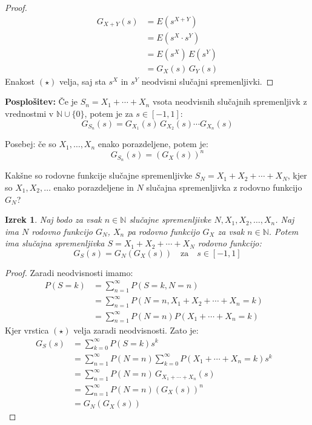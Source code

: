 \documentclass[12pt]{book}
\def\n{\noindent}
\def\s{\vspace{10pt}}
\theoremstyle{definition}
\theoremstyle{plain}
\newtheorem{izrek}{Izrek}
\theoremstyle{plain}
\theoremstyle{plain}
\theoremstyle{remark}
\begin{document}
\begin{proof}
    \begin{align*}
        G_{X+Y}(s)&=E\left(s^{X+Y}\right) \\
        &=E(s^X \cdot s^Y) \\
        &=E(s^X) \, E(s^Y) \tag{$\star$} \\
        &=G_X(s) \, G_Y(s)
    \end{align*}
    Enakost $(\star)$ velja, saj sta $s^X$ in $s^Y$ neodvisni slučajni spremenljivki.
\end{proof}

\n \textbf{Posplošitev:} Če je $S_n=X_1 + \cdots + X_n$ vsota neodvisnih slučajnih spremenljivk z vrednostmi v $\mathbb{N} \cup \{0\}$, potem je za $s \in [-1, 1]$: 
$$
G_{S_n}(s)=G_{X_1}(s)\, G_{X_2}(s) \cdots G_{X_n}(s)
$$

\n Posebej: če so $X_1, \ldots, X_n$ enako porazdeljene, potem je: 
$$
G_{S_n}(s)=\left(G_X(s)\right)^n
$$

\s

\n Kakšne so rodovne funkcije slučajne spremenljivke $S_N=X_1 + X_2 + \cdots + X_N$, kjer so $X_1, X_2, \ldots$ enako porazdeljene in $N$ slučajna spremenljivka z rodovno funkcijo $G_N$?

\begin{izrek}
    Naj bodo za vsak $n \in \mathbb{N}$ slučajne spremenljivke $N, X_1, X_2, \ldots, X_n$. Naj ima $N$ rodovno funkcijo $G_N$, $X_n$ pa rodovno funkcijo $G_X$ za vsak $n \in \mathbb{N}$. Potem ima slučajna spremenljivka $S=X_1+X_2+\cdots+X_N$ rodovno funkcijo: 
    $$
    G_S(s)=G_N\left(G_X(s)\right) \quad \text{za} \quad s \in [-1,1]
    $$
\end{izrek}

\begin{proof}
    Zaradi neodvisnosti imamo: 
    \begin{align*}
        P(S=k)&=\sum_{n=1}^{\infty} P(S=k, N=n) & \\
        &=\sum_{n=1}^{\infty} P\left(N=n, X_1+X_2+ \cdots +X_n=k\right) & \\
        &=\sum_{n=1}^{\infty} P(N=n) P\left(X_1+\cdots+X_n=k\right) & \tag{$\star$}
    \end{align*}
    Kjer vrstica $(\star)$ velja zaradi neodvisnosti. Zato je: 
    \begin{align*}
        G_S(s)&=\sum_{k=0}^{\infty} P(S=k) s^k & \\
        &=\sum_{n=1}^{\infty} P(N=n) \sum_{k=0}^{\infty} P\left(X_1+\cdots+X_n=k\right)  s^k & \\
        &=\sum_{n=1}^{\infty} P(N=n) \, G_{X_1+\cdots+X_n}\left(s\right) & \\
        &=\sum_{n=1}^{\infty} P(N=n) \left(G_X(s)\right)^n & \\
        &=G_N\left(G_X(s)\right)
    \end{align*}
\end{proof}
\end{document}
